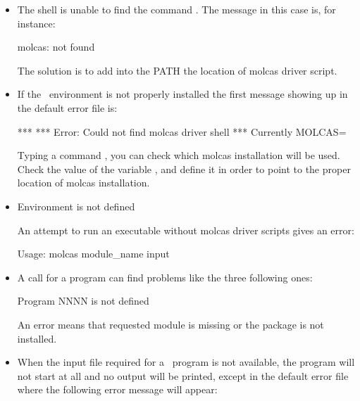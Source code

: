 \begin{itemize}


\item The shell is unable to find the command .
      The message in this case is, for instance:

\begin{sourcelisting}
  molcas:  not found
\end{sourcelisting}

 The solution is to add into the PATH the location of molcas driver script.


\item If the \molcas\ environment is not properly installed the
 first message showing up in the default error file is:

\begin{sourcelisting}
***
*** Error: Could not find molcas driver shell
*** Currently MOLCAS=
\end{sourcelisting}
 
 Typing a command , you can check which molcas
 installation will be used. Check the value of the variable ,
 and define it in order to point to the proper location of molcas installation.
 

\item Environment is not defined

 An attempt to run an executable without molcas driver scripts gives
 an error:
\begin{sourcelisting}
  Usage: molcas module_name input
\end{sourcelisting}



 \item A call for a program can find problems like the three following ones:

\begin{sourcelisting}
Program NNNN is not defined 
\end{sourcelisting}
 
An error means that requested module is missing or the package is not installed.


\item When the input file required for a \molcas\ program is not
      available, the program will not start at all and no output
      will be printed, except in the default error file where the
      following error message will appear:


\end{itemize}
